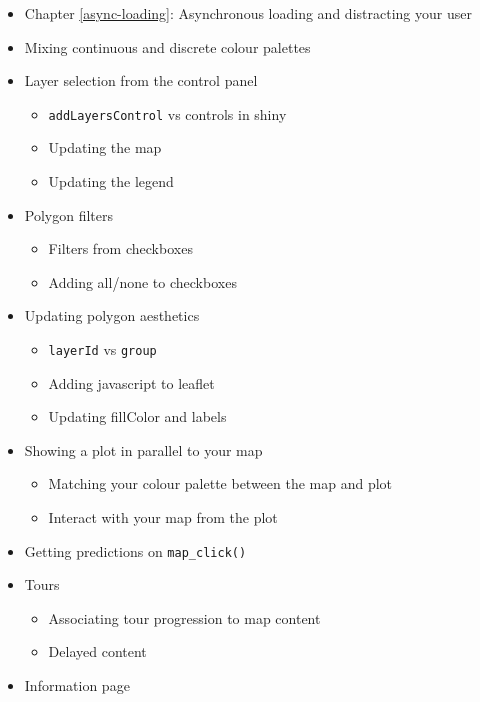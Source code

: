 \documentclass[
]{book}
\providecommand{\tightlist}{%
  \setlength{\itemsep}{0pt}\setlength{\parskip}{0pt}}
\begin{document}
\begin{itemize}
\tightlist
\item
  Chapter \ref{async-loading}: Asynchronous loading and distracting your user
\item
  Mixing continuous and discrete colour palettes
\item
  Layer selection from the control panel

  \begin{itemize}
  \tightlist
  \item
    \texttt{addLayersControl} vs controls in shiny
  \item
    Updating the map
  \item
    Updating the legend
  \end{itemize}
\item
  Polygon filters

  \begin{itemize}
  \tightlist
  \item
    Filters from checkboxes
  \item
    Adding all/none to checkboxes
  \end{itemize}
\item
  Updating polygon aesthetics

  \begin{itemize}
  \tightlist
  \item
    \texttt{layerId} vs \texttt{group}
  \item
    Adding javascript to leaflet
  \item
    Updating fillColor and labels
  \end{itemize}
\item
  Showing a plot in parallel to your map

  \begin{itemize}
  \tightlist
  \item
    Matching your colour palette between the map and plot
  \item
    Interact with your map from the plot
  \end{itemize}
\item
  Getting predictions on \texttt{map\_click()}
\item
  Tours

  \begin{itemize}
  \tightlist
  \item
    Associating tour progression to map content
  \item
    Delayed content
  \end{itemize}
\item
  Information page
\end{itemize}
\end{document}
